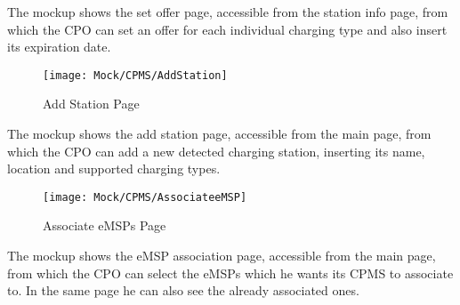 The mockup shows the set offer page, accessible from the station info page, from which the CPO can set an offer for each individual charging type and also insert its expiration date.
\begin{figure}[H]
    \begin{center}
    \texttt{[image: Mock/CPMS/AddStation]}
    \caption{Add Station Page}
    \label{fig:AddStation}
    \end{center}
\end{figure}
The mockup shows the add station page, accessible from the main page, from which the CPO can add a new detected charging station, inserting its name, location and supported charging types.
\begin{figure}[H]
    \begin{center}
    \texttt{[image: Mock/CPMS/AssociateeMSP]}
    \caption{Associate eMSPs Page}
    \label{fig:AssociateeMSP}
    \end{center}
\end{figure}
The mockup shows the eMSP association page, accessible from the main page, from which the CPO can select the eMSPs which he wants its CPMS to associate to. In the same page he can also see the already associated ones.